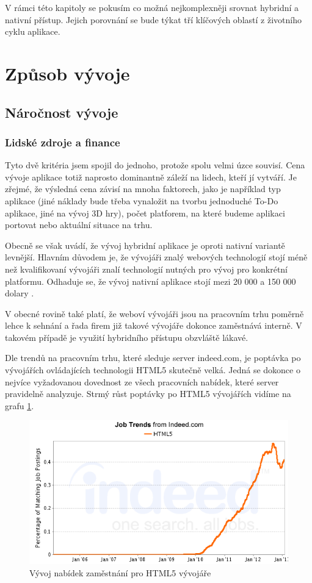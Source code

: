 V rámci této kapitoly se pokusím co možná nejkomplexněji srovnat hybridní a nativní přístup. Jejich porovnání se bude týkat tří klíčových oblastí z životního cyklu aplikace.

\section{Způsob vývoje}
\subsection{Náročnost vývoje}
\subsubsection{Lidské zdroje a finance}
Tyto dvě kritéria jsem spojil do jednoho, protože spolu velmi úzce souvisí. Cena vývoje aplikace totiž naprosto dominantně záleží na lidech, kteří jí vytváří. Je zřejmé, že výsledná cena závisí na mnoha faktorech, jako je například typ aplikace (jiné náklady bude třeba vynaložit na tvorbu jednoduché To-Do aplikace, jiné na vývoj 3D hry), počet platforem, na které budeme aplikaci portovat nebo aktuální situace na trhu.

Obecně se však uvádí, že vývoj hybridní aplikace je oproti nativní variantě levnější. Hlavním důvodem je, že vývojáři znalý webových technologií stojí méně než kvalifikovaní vývojáři znalí technologií nutných pro vývoj pro konkrétní platformu. Odhaduje se, že vývoj nativní aplikace stojí mezi 20 000 a 150 000 dolary \cite{mrc_native_wrong_choice}.

V obecné rovině také platí, že weboví vývojáři jsou na pracovním trhu poměrně lehce k sehnání a řada firem již takové vývojáře dokonce zaměstnává interně. V takovém případě je využití hybridního přístupu obzvláště lákavé.

Dle trendů na pracovním trhu, které sleduje server indeed.com, je poptávka po vývojářích ovládajících technologii HTML5 skutečně velká. Jedná se dokonce o nejvíce vyžadovanou dovednost ze všech pracovních nabídek, které server pravidelně analyzuje. Strmý růst poptávky po HTML5 vývojářích vidíme na grafu \ref{fig:HTML5Jobs}.

\begin{figure}\centering
\includegraphics[width=1.0\textwidth]{jobgraph_html5.png}
\caption{Vývoj nabídek zaměstnání pro HTML5 vývojáře \cite{job_indeed}}
\label{fig:HTML5Jobs}
\end{figure}

